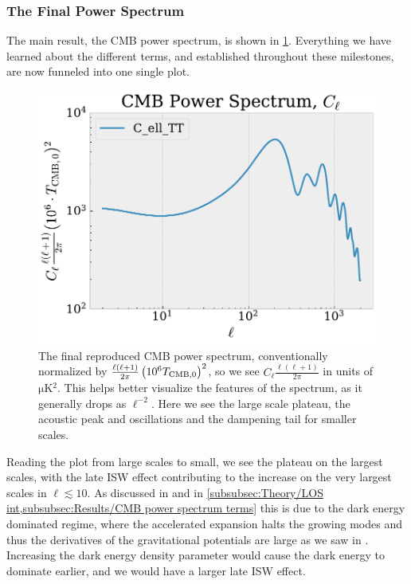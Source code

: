 \documentclass[10pt,a4paper]{article}
\begin{document}
\subsubsection{The Final Power Spectrum}
\label{subsubsec:Results/Final power spectrum}
The main result, the CMB power spectrum, is shown in \cref{fig: Cell}. Everything we have learned about the different terms, and established throughout these milestones, are now funneled into one single plot.
\begin{figure}[ht!]
  \centering
  \includegraphics[scale=0.5]{../figs/Cells.pdf}
  \caption{The final reproduced CMB power spectrum, conventionally normalized by $\frac{\ell(\ell+1)}{2\pi}\left(10^6T_{\rm CMB,0}\right)^2$, so we see $C_\ell\frac{\ell(\ell+1)}{2\pi}$ in units of $\si{\micro\kelvin^2}$. This helps better visualize the features of the spectrum, as it generally drops as $\ell^{-2}$. Here we see the large scale plateau, the acoustic peak and oscillations and the dampening tail for smaller scales.}
  \label{fig: Cell}
\end{figure}
Reading the plot from large scales to small, we see the plateau on the largest scales, with the late ISW effect contributing to the increase on the very largest scales in $\ell \lesssim 10$. As discussed in \cite{milestone3} and in \cref{subsubsec:Theory/LOS int,subsubsec:Results/CMB power spectrum terms} this is due to the dark energy dominated regime, where the accelerated expansion halts the growing modes and thus the derivatives of the gravitational potentials are large as we saw in \cite{milestone3}. Increasing the dark energy density parameter would cause the dark energy to dominate earlier, and we would have a larger late ISW effect.
\end{document}
